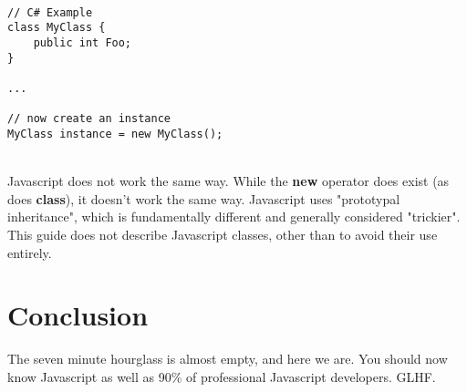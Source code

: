 \documentclass{article}
\begin{document}
\begin{verbatim}

// C# Example
class MyClass {
	public int Foo;
}

...

// now create an instance
MyClass instance = new MyClass();
\end{verbatim}

\noindent
\\
Javascript does not work the same way. While the \textbf{new} operator does exist (as does \textbf{class}), it doesn't work the same way. Javascript uses "prototypal inheritance", which is fundamentally different and generally considered "trickier". This guide does not describe Javascript classes, other than to avoid their use entirely.

\section{Conclusion}

The seven minute hourglass is almost empty, and here we are. You should now know Javascript as well as 90\% of professional Javascript developers. GLHF.
\end{document}
